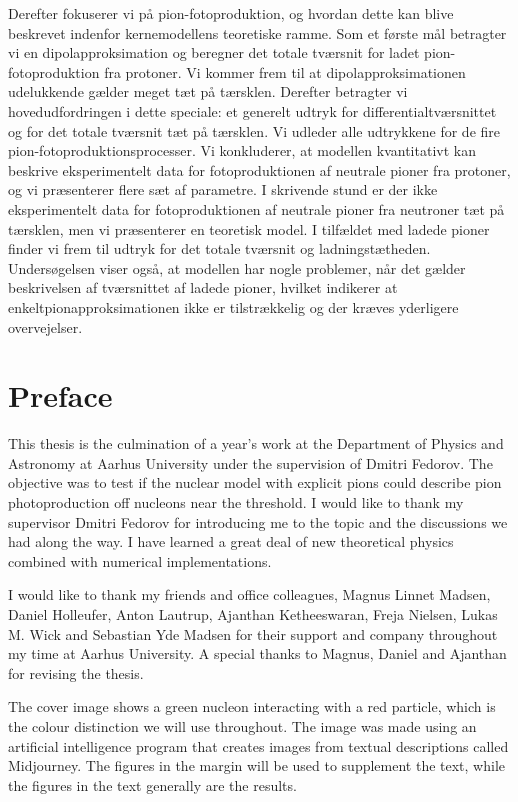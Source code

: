 Derefter fokuserer vi på pion-fotoproduktion, og hvordan dette kan blive beskrevet indenfor kernemodellens teoretiske ramme. Som et første mål betragter vi en dipolapproksimation og beregner det totale tværsnit for ladet pion-fotoproduktion fra protoner. Vi kommer frem til at dipolapproksimationen udelukkende gælder meget tæt på tærsklen. Derefter betragter vi hovedudfordringen i dette speciale: et generelt udtryk for differentialtværsnittet og for det totale tværsnit tæt på tærsklen. Vi udleder alle udtrykkene for de fire pion-fotoproduktionsprocesser. Vi konkluderer, at modellen kvantitativt kan beskrive eksperimentelt data for fotoproduktionen af neutrale pioner fra protoner, og vi præsenterer flere sæt af parametre. I skrivende stund er der ikke eksperimentelt data for fotoproduktionen af neutrale pioner fra neutroner tæt på tærsklen, men vi præsenterer en teoretisk model. I tilfældet med ladede pioner finder vi frem til udtryk for det totale tværsnit og ladningstætheden. Undersøgelsen viser også, at modellen har nogle problemer, når det gælder beskrivelsen af tværsnittet af ladede pioner, hvilket indikerer at enkeltpionapproksimationen ikke er tilstrækkelig og der kræves yderligere overvejelser.

\newpage
\section*{Preface}
\thispagestyle{empty}
This thesis is the culmination of a year's work at the Department of Physics and Astronomy at Aarhus University under the supervision of Dmitri Fedorov. The objective was to test if the nuclear model with explicit pions could describe pion photoproduction off nucleons near the threshold.
I would like to thank my supervisor Dmitri Fedorov for introducing me to the topic and the discussions we had along the way. I have learned a great deal of new theoretical physics combined with numerical implementations. 

I would like to thank my friends and office colleagues, Magnus Linnet Madsen, Daniel Holleufer, Anton Lautrup, Ajanthan Ketheeswaran, Freja Nielsen, Lukas M. Wick and Sebastian Yde Madsen for their support and company throughout my time at Aarhus University. A special thanks to Magnus, Daniel and Ajanthan for revising the thesis.

The cover image shows a green nucleon interacting with a red particle, which is the colour distinction we will use throughout. The image was made using an artificial intelligence program that creates images from textual descriptions called Midjourney. The figures in the margin will be used to supplement the text, while the figures in the text generally are the results.
\vspace{1cm}
\newpage